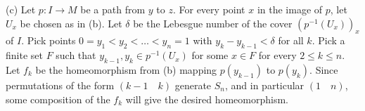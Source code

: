 \documentclass{article}
\begin{document}
(c) Let $p:I \to M$ be a path from $y$ to $z$. For every point $x$ in the image of $p$, let $U_x$ be chosen as in (b).  Let $\delta$ be the Lebesgue number of the cover $(p^{-1}(U_x))_x$ of $I$.  Pick points $0 = y_1 < y_2 < \ldots < y_n = 1$ with $y_k - y_{k-1} < \delta$ for all $k$.  Pick a finite set $F$ such that $y_{k-1}, y_k \in p^{-1}(U_x)$ for some $x \in F$ for every $2 \le k \le n$. Let $f_k$ be the homeomorphism from (b) mapping $p(y_{k-1})$ to $p(y_k)$.  Since permutations of the form $(k-1 \quad k)$ generate $S_n$, and in particular $(1 \quad n)$, some composition of the $f_k$ will give the desired homeomorphism.
\end{document}
